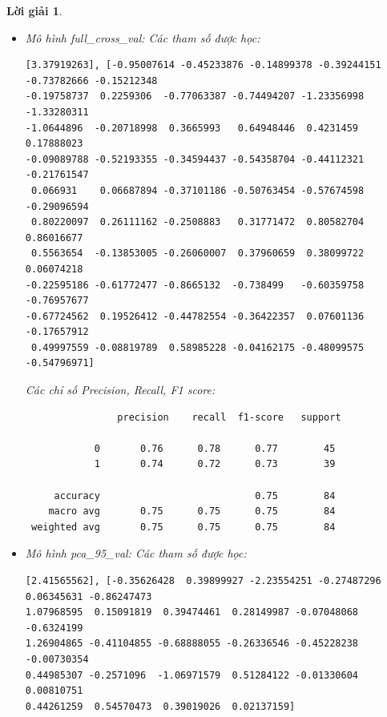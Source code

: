 \documentclass[14pt, a4paper]{article}
\theoremstyle{sltheorem}
\theoremstyle{soltheorem}
\newtheorem*{loigiai}{Lời giải}
\begin{document}
\begin{loigiai}
\begin{itemize}
\begin{verbatim}
           0       0.91      0.87      0.89        45
           1       0.85      0.90      0.88        39

    accuracy                           0.88        84
   macro avg       0.88      0.88      0.88        84
weighted avg       0.88      0.88      0.88        84
        \end{verbatim}

        Nhãn 0 tương ứng với nhãn "M" và nhãn 1 tương ứng với nhãn "R"

        \item Mô hình full\_cross\_val:
        Các tham số được học:

        \begin{verbatim}
[3.37919263], [-0.95007614 -0.45233876 -0.14899378 -0.39244151 -0.73782666 -0.15212348
-0.19758737  0.2259306  -0.77063387 -0.74494207 -1.23356998 -1.33280311
-1.0644896  -0.20718998  0.3665993   0.64948446  0.4231459   0.17888023
-0.09089788 -0.52193355 -0.34594437 -0.54358704 -0.44112321 -0.21761547
 0.066931    0.06687894 -0.37101186 -0.50763454 -0.57674598 -0.29096594
 0.80220097  0.26111162 -0.2508883   0.31771472  0.80582704  0.86016677
 0.5563654  -0.13853005 -0.26060007  0.37960659  0.38099722  0.06074218
-0.22595186 -0.61772477 -0.8665132  -0.738499   -0.60359758 -0.76957677
-0.67724562  0.19526412 -0.44782554 -0.36422357  0.07601136 -0.17657912
 0.49997559 -0.08819789  0.58985228 -0.04162175 -0.48099575 -0.54796971]
        \end{verbatim}

        Các chỉ số Precision, Recall, F1 score:

        \begin{verbatim}
                precision    recall  f1-score   support

            0       0.76      0.78      0.77        45
            1       0.74      0.72      0.73        39
 
     accuracy                           0.75        84
    macro avg       0.75      0.75      0.75        84
 weighted avg       0.75      0.75      0.75        84
        \end{verbatim}

        \item Mô hình pca\_95\_val:
        Các tham số được học:

        \begin{verbatim}
[2.41565562], [-0.35626428  0.39899927 -2.23554251 -0.27487296  0.06345631 -0.86247473
1.07968595  0.15091819  0.39474461  0.28149987 -0.07048068 -0.6324199
1.26904865 -0.41104855 -0.68888055 -0.26336546 -0.45228238 -0.00730354
0.44985307 -0.2571096  -1.06971579  0.51284122 -0.01330604  0.00810751
0.44261259  0.54570473  0.39019026  0.02137159]
        \end{verbatim}


\end{itemize}
\end{loigiai}
\end{document}
